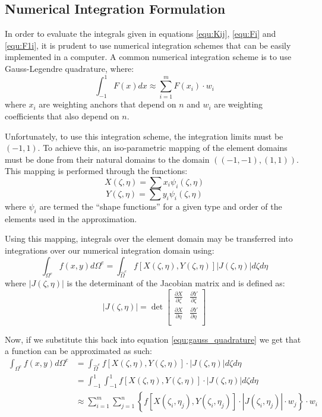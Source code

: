 \documentclass[letterpaper,10pt]{article}
\begin{document}
\subsection{Numerical Integration Formulation}
In order to evaluate the integrals given in equations \ref{equ:Kij}, \ref{equ:Fi} and \ref{equ:F1i}, it is prudent to use numerical integration schemes that can be easily implemented in a computer. A common numerical integration scheme is to use Gauss-Legendre quadrature, where:
\begin{equation}
\label{equ:gauss_quadrature}
\int_{-1}^1 F(x)dx \approx \sum_{i=1}^mF(x_i)\cdot w_i
\end{equation}
\noindent where $x_i$ are weighting anchors that depend on $n$ and $w_i$ are weighting coefficients that also depend on $n$.

Unfortunately, to use this integration scheme, the integration limits must be $(-1,1)$. To achieve this, an iso-parametric mapping of the element domains must be done from their natural domains to the domain $\left((-1,-1),(1,1)\right)$. This mapping is performed through the functions:
\[X(\zeta,\eta) = \sum x_i \psi_i(\zeta,\eta)\]
\[Y(\zeta,\eta) = \sum y_i \psi_i(\zeta,\eta)\]
\noindent where $\psi_i$ are termed the ``shape functions'' for a given type and order of the elements used in the approximation.

Using this mapping, integrals over the element domain may be transferred into integrations over our numerical integration domain using:
\[
\int_{\Omega^e} f(x,y)d\Omega^e = \int_{\hat{\Omega}^e}f\left[X(\zeta,\eta),Y(\zeta,\eta)\right]\left|J(\zeta,\eta)\right|d\zeta d\eta
\]
\noindent where $\left|J(\zeta,\eta)\right|$ is the determinant of the Jacobian matrix and is defined as:
\[
\left|J(\zeta,\eta)\right| = \det \left[\begin{array}{cc}
\frac{\partial X}{\partial \zeta} & \frac{\partial Y}{\partial \zeta} \\
\frac{\partial X}{\partial \eta} & \frac{\partial Y}{\partial \eta} \\
\end{array}\right]
\]

Now, if we substitute this back into equation \ref{equ:gauss_quadrature} we get that a function can be approximated as such:
\begin{equation}
\label{equ:numint}
\begin{split}
	\int_{\Omega^e} f(x,y)d\Omega^e &= \int_{\hat{\Omega}^e}f\left[X(\zeta,\eta),Y(\zeta,\eta)\right]\cdot\left|J(\zeta,\eta)\right|d\zeta d\eta \\
	&= \int_{-1}^{1}\int_{-1}^1f\left[X(\zeta,\eta),Y(\zeta,\eta)\right]\cdot\left|J(\zeta,\eta)\right|d\zeta d\eta \\
	&\approx \sum_{i=1}^m\sum_{j=1}^n\left\{f\left[X(\zeta_i,\eta_j),Y(\zeta_i,\eta_j)\right]\cdot\left|J(\zeta_i,\eta_j)\right| \cdot w_j \right\}\cdot w_i
\end{split}
\end{equation}
\end{document}
